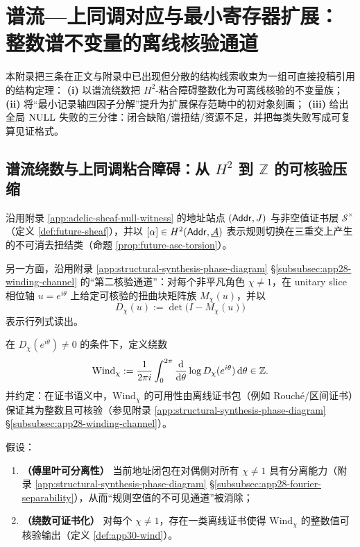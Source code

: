 \section{谱流—上同调对应与最小寄存器扩展：整数谱不变量的离线核验通道}\label{app:spectral-flow-cohomology-min-register}

本附录把三条在正文与附录中已出现但分散的结构线索收束为一组可直接投稿引用的结构定理：
\textbf{(i)} 以谱流绕数把 $H^2$-粘合障碍整数化为可离线核验的不变量族；
\textbf{(ii)} 将“最小记录轴四因子分解”提升为扩展保存范畴中的初对象刻画；
\textbf{(iii)} 给出全局 $\mathrm{NULL}$ 失败的三分律：闭合缺陷/谱扭结/资源不足，并把每类失败写成可复算见证格式。

\subsection{谱流绕数与上同调粘合障碍：从 $H^2$ 到 $\mathbb{Z}$ 的可核验压缩}\label{subsec:app30-spectral-flow-to-h2}

沿用附录 \ref{app:adelic-sheaf-null-witness} 的地址站点 $(\mathsf{Addr},J)$ 与非空值证书层 $\mathcal{S}^\times$（定义 \ref{def:future-sheaf}），并以 $[\alpha]\in H^2(\mathsf{Addr},\underline{\mathcal{A}})$ 表示规则切换在三重交上产生的不可消去扭结类（命题 \ref{prop:future-asc-torsion}）。
\par
另一方面，沿用附录 \ref{app:structural-synthesis-phase-diagram} \S\ref{subsubsec:app28-winding-channel} 的“第二核验通道”：对每个非平凡角色 $\chi\neq 1$，在 unitary slice 相位轴 $u=e^{i\theta}$ 上给定可核验的扭曲块矩阵族 $M_\chi(u)$，并以
$$
D_\chi(u):=\det\!\bigl(I-M_\chi(u)\bigr)
$$
表示行列式读出。

\begin{definition}[绕数谱不变量]\label{def:app30-wind}
在 $D_\chi(e^{i\theta})\neq 0$ 的条件下，定义绕数
$$
\mathrm{Wind}_\chi
:=\frac{1}{2\pi i}\int_{0}^{2\pi}\frac{\mathrm{d}}{\mathrm{d}\theta}\log D_\chi(e^{i\theta})\,\mathrm{d}\theta
\in\mathbb{Z}.
$$
并约定：在证书语义中，$\mathrm{Wind}_\chi$ 的可用性由离线证书包（例如 Rouch\'e/区间证书）保证其为整数且可核验（参见附录 \ref{app:structural-synthesis-phase-diagram} \S\ref{subsubsec:app28-winding-channel}）。
\end{definition}

\begin{assumption}[对偶侧可分离性与谱流可证书化]\label{ass:app30-separability-wind}
假设：
\begin{enumerate}
  \item \textbf{（傅里叶可分离性）} 当前地址闭包在对偶侧对所有 $\chi\neq 1$ 具有分离能力（附录 \ref{app:structural-synthesis-phase-diagram} \S\ref{subsubsec:app28-fourier-separability}），从而“规则空值的不可见通道”被消除；
  \item \textbf{（绕数可证书化）} 对每个 $\chi\neq 1$，存在一类离线证书使得 $\mathrm{Wind}_\chi$ 的整数值可核验输出（定义 \ref{def:app30-wind}）。
\end{enumerate}
\end{assumption}

